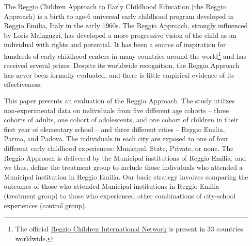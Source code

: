 The Reggio Children Approach to Early Childhood Education (the Reggio Approach) is a birth to age-6 universal early childhood program developed in Reggio Emilia, Italy  in the early 1960s. The Reggio Approach, strongly influenced by Loris Malaguzzi, has developed a more progressive vision of the child as an individual with rights and potential. It has been a source of inspiration for hundreds of early childhood centers in many countries around the world\footnote{The official \href{http://www.reggiochildren.it/network/?lang=en}{Reggio Children International Network} is present in 33 countries worldwide.} and has received several prizes. Despite its worldwide recognition, the Reggio Approach has never been formally evaluated, and there is little empirical evidence of its effectiveness. 

This paper presents an evaluation of the Reggio Approach. The study utilizes non-experimental data on individuals from five different age cohorts -- three cohorts of adults, one cohort of adolescents, and one cohort of children in their first year of elementary school -- and three different cities -- Reggio Emilia, Parma, and Padova. The individuals in each city are exposed to one of four different early childhood experiences: Municipal, State, Private, or none. The Reggio Approach is delivered by the Municipal institutions of Reggio Emilia, and we thus, define the treatment group to include those individuals who attended a Municipal institution in Reggio Emilia. Our basic strategy involves comparing the outcomes of those who attended Municipal institutions in Reggio Emilia (treatment group) to those who experienced other combinations of city-school experiences (control group).

